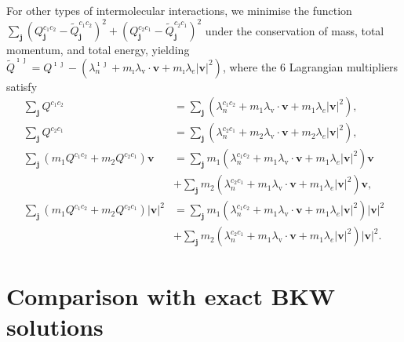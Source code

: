 For other types of intermolecular interactions,  we minimise the function  $\sum_\textbf{j}(Q_\textbf{j}^{c_1c_2}-\tilde{Q}_\textbf{j}^{c_1c_2})^2+(Q_\textbf{j}^{c_2c_1}-\tilde{Q}_\textbf{j}^{c_2c_1})^2$ under the conservation of mass, total momentum, and total energy,  yielding
   $ \widetilde{Q}^{\imath\jmath}={Q}^{\imath\jmath}-(\lambda_n^{\imath\jmath}+m_\imath\lambda_\text{v}\cdot{}\textbf{v}+m_\imath\lambda_e|\textbf{v}|^2)$,
where the 6 Lagrangian multipliers satisfy
\begin{equation}
\begin{split}
  \sum_\textbf{j} Q^{c_1c_2}&=\sum_\textbf{j} (\lambda_n^{c_1c_2}+m_1\lambda_\text{v}\cdot{}\textbf{v}+m_1\lambda_e |\textbf{v}|^2), \\
    \sum_\textbf{j} Q^{c_2c_1}&=\sum_\textbf{j} (\lambda_n^{c_2c_1}+m_2\lambda_\text{v}\cdot{}\textbf{v}+m_2\lambda_e |\textbf{v}|^2), \\  
    \sum_\textbf{j} (m_1Q^{c_1c_2}+m_2Q^{c_2c_1})\textbf{v}&=\sum_\textbf{j}m_1 (\lambda_n^{c_1c_2}+m_1\lambda_\text{v}\cdot{}\textbf{v}+m_1\lambda_e |\textbf{v}|^2)\textbf{v}\\
    &
    +\sum_\textbf{j}m_2 (\lambda_n^{c_2c_1}+m_1\lambda_\text{v}\cdot{}\textbf{v}+m_1\lambda_e |\textbf{v}|^2)\textbf{v}, \\
       \sum_\textbf{j} (m_1Q^{c_1c_2}+m_2Q^{c_2c_1})|\textbf{v}|^2&=\sum_\textbf{j}m_1 (\lambda_n^{c_1c_2}+m_1\lambda_\text{v}\cdot{}\textbf{v}+m_1\lambda_e |\textbf{v}|^2)|\textbf{v}|^2\\
           &
           +\sum_\textbf{j}m_2 (\lambda_n^{c_2c_1}+m_1\lambda_\text{v}\cdot{}\textbf{v}+m_1\lambda_e |\textbf{v}|^2)|\textbf{v}|^2.
\end{split}
\end{equation}



\section{Comparison with exact BKW solutions}


